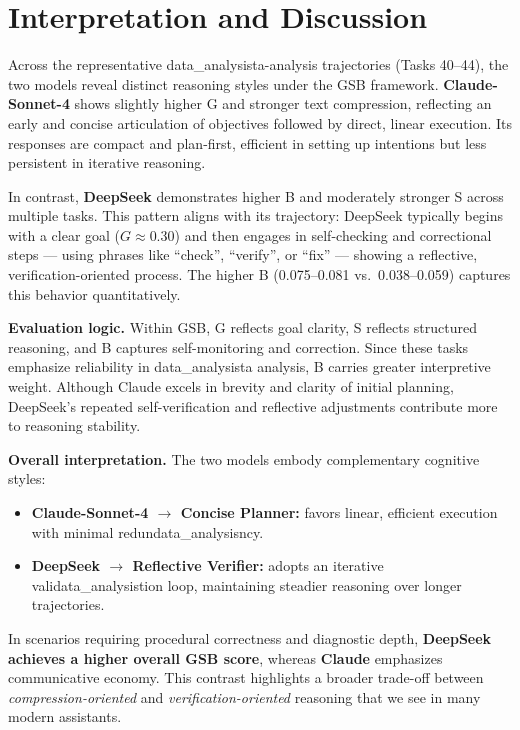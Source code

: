 \documentclass[11pt]{article}
\begin{document}
\section{Interpretation and Discussion}
Across the representative data\_analysista-analysis trajectories (Tasks 40--44), the two models reveal distinct reasoning styles under the GSB framework.
\textbf{Claude-Sonnet-4} shows slightly higher G and stronger text compression, reflecting an early and concise articulation of objectives followed by direct, linear execution.
Its responses are compact and plan-first, efficient in setting up intentions but less persistent in iterative reasoning.

In contrast, \textbf{DeepSeek} demonstrates higher B and moderately stronger S across multiple tasks.
This pattern aligns with its trajectory: DeepSeek typically begins with a clear goal ($G \approx 0.30$) and then engages in self-checking and correctional steps --- using phrases like ``check'', ``verify'', or ``fix'' --- showing a reflective, verification-oriented process.
The higher B (0.075--0.081 vs.\ 0.038--0.059) captures this behavior quantitatively.

\textbf{Evaluation logic.} Within GSB, G reflects goal clarity, S reflects structured reasoning, and B captures self-monitoring and correction.
Since these tasks emphasize reliability in data\_analysista analysis, B carries greater interpretive weight.
Although Claude excels in brevity and clarity of initial planning, DeepSeek’s repeated self-verification and reflective adjustments contribute more to reasoning stability.

\textbf{Overall interpretation.} The two models embody complementary cognitive styles:
\begin{itemize}
  \item \textbf{Claude-Sonnet-4 $\rightarrow$ Concise Planner:} favors linear, efficient execution with minimal redundata\_analysisncy.
  \item \textbf{DeepSeek $\rightarrow$ Reflective Verifier:} adopts an iterative validata\_analysistion loop, maintaining steadier reasoning over longer trajectories.
\end{itemize}

In scenarios requiring procedural correctness and diagnostic depth, \textbf{DeepSeek achieves a higher overall GSB score}, whereas \textbf{Claude} emphasizes communicative economy.
This contrast highlights a broader trade-off between \emph{compression-oriented} and \emph{verification-oriented} reasoning that we see in many modern assistants.
\end{document}
